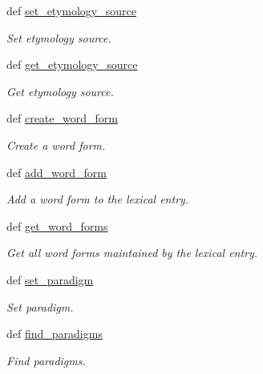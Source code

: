 \begin{DoxyCompactItemize}
def \hyperlink{classlmf_1_1src_1_1core_1_1lexical__entry_1_1_lexical_entry_a82d85b914a1dd8f6ad6738b25c5ea172}{set\+\_\+etymology\+\_\+source}
\begin{DoxyCompactList}\small\item\em Set etymology source. \end{DoxyCompactList}\item 
def \hyperlink{classlmf_1_1src_1_1core_1_1lexical__entry_1_1_lexical_entry_a94b171c5e86e2fdeabb7bff1bc32de10}{get\+\_\+etymology\+\_\+source}
\begin{DoxyCompactList}\small\item\em Get etymology source. \end{DoxyCompactList}\item 
def \hyperlink{classlmf_1_1src_1_1core_1_1lexical__entry_1_1_lexical_entry_afa9239b3df5d96fa1648e634e8ff471c}{create\+\_\+word\+\_\+form}
\begin{DoxyCompactList}\small\item\em Create a word form. \end{DoxyCompactList}\item 
def \hyperlink{classlmf_1_1src_1_1core_1_1lexical__entry_1_1_lexical_entry_a6d961cc5d3d155c2c93d4e991b766f04}{add\+\_\+word\+\_\+form}
\begin{DoxyCompactList}\small\item\em Add a word form to the lexical entry. \end{DoxyCompactList}\item 
def \hyperlink{classlmf_1_1src_1_1core_1_1lexical__entry_1_1_lexical_entry_a78f21adcc19aca799e18e7ae89588e83}{get\+\_\+word\+\_\+forms}
\begin{DoxyCompactList}\small\item\em Get all word forms maintained by the lexical entry. \end{DoxyCompactList}\item 
def \hyperlink{classlmf_1_1src_1_1core_1_1lexical__entry_1_1_lexical_entry_a5183e8be3b27dd7ff7f8ad2bc100c289}{set\+\_\+paradigm}
\begin{DoxyCompactList}\small\item\em Set paradigm. \end{DoxyCompactList}\item 
def \hyperlink{classlmf_1_1src_1_1core_1_1lexical__entry_1_1_lexical_entry_a4d29b1f69f6591832869bdfdbed1dc90}{find\+\_\+paradigms}
\begin{DoxyCompactList}\small\item\em Find paradigms. \end{DoxyCompactList}\item 

\end{DoxyCompactItemize}
